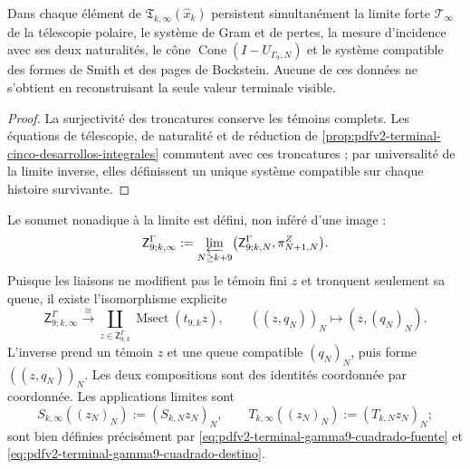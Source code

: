 \begin{corollary}
\label{cor:pdfv2-terminal-limite-cinco-desarrollos}
Dans chaque élément de \(\mathfrak T_{k,\infty}(\widehat x_k)\) persistent simultanément la limite forte \(\mathcal T_\infty\) de la télescopie polaire, le système de Gram et de pertes, la mesure d'incidence avec ses deux naturalités, le cône \(\operatorname{Cone}(I-U_{\Gamma_9,N})\) et le système compatible des formes de Smith et des pages de Bockstein. Aucune de ces données ne s'obtient en reconstruisant la seule valeur terminale visible.
\end{corollary}

\begin{proof}
La surjectivité des troncatures conserve les témoins complets. Les équations de télescopie, de naturalité et de réduction de \cref{prop:pdfv2-terminal-cinco-desarrollos-integrales} commutent avec ces troncatures ; par universalité de la limite inverse, elles définissent un unique système compatible sur chaque histoire survivante.
\end{proof}

Le sommet nonadique à la limite est défini, non inféré d'une image :
\begin{equation}
\label{eq:pdfv2-terminal-gamma9-apice-limite-raw}
 \mathsf Z^\Gamma_{9;k,\infty}
 :=\varprojlim_{N\geq k+9}
 \bigl(\mathsf Z^\Gamma_{9;k,N},\pi^Z_{N+1,N}\bigr).
\end{equation}
Puisque les liaisons ne modifient pas le témoin fini \(z\) et tronquent seulement sa queue, il existe l'isomorphisme explicite
\begin{equation}
\label{eq:pdfv2-terminal-gamma9-apice-limite-msect}
 \mathsf Z^\Gamma_{9;k,\infty}
 \xrightarrow{\ \cong\ }
 \coprod_{z\in\mathsf Z^\Gamma_{9,k}}
 \operatorname{Msect}(t_{9,k}z),\qquad
 ((z,q_N))_N\longmapsto(z,(q_N)_N).
\end{equation}
L'inverse prend un témoin \(z\) et une queue compatible \((q_N)_N\), puis forme \(((z,q_N))_N\). Les deux compositions sont des identités coordonnée par coordonnée. Les applications limites sont
\begin{equation}
\label{eq:pdfv2-terminal-gamma9-mapas-limite-raw}
 S_{k,\infty}((z_N)_N):=(S_{k,N}z_N)_N,\qquad
 T_{k,\infty}((z_N)_N):=(T_{k,N}z_N)_N;
\end{equation}
sont bien définies précisément par \eqref{eq:pdfv2-terminal-gamma9-cuadrado-fuente} et \eqref{eq:pdfv2-terminal-gamma9-cuadrado-destino}.

